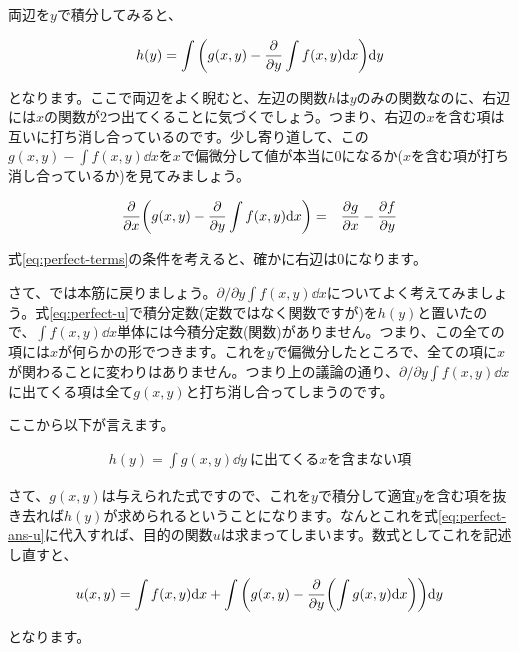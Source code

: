 両辺を$y$で積分してみると、

\begin{eqnarray}
    h(y)=\int\pqty{g(x,y)-\frac{\partial}{\partial y}\int f(x,y) \dd x}\dd y
\end{eqnarray}

\noindent
となります。ここで両辺をよく睨むと、左辺の関数$h$は$y$のみの関数なのに、右辺には$x$の関数が2つ出てくることに気づくでしょう。つまり、右辺の$x$を含む項は互いに打ち消し合っているのです。少し寄り道して、この$g(x,y)-\int f(x,y) \dd x$を$x$で偏微分して値が本当に0になるか($x$を含む項が打ち消し合っているか)を見てみましょう。

\begin{eqnarray}
    \frac{\partial}{\partial x}\pqty{g(x,y)-\frac{\partial}{\partial y}\int f(x,y) \dd x}&=&\frac{\partial g}{\partial x}-\frac{\partial f}{\partial y}
\end{eqnarray}

式\ref{eq:perfect-terms}の条件を考えると、確かに右辺は0になります。

さて、では本筋に戻りましょう。$\partial/\partial y\int f(x,y) \dd x$についてよく考えてみましょう。式\ref{eq:perfect-u}で積分定数(定数ではなく関数ですが)を$h(y)$と置いたので、$\int f(x,y) \dd x$単体には今積分定数(関数)がありません。つまり、この全ての項には$x$が何らかの形でつきます。これを$y$で偏微分したところで、全ての項に$x$が関わることに変わりはありません。つまり上の議論の通り、$\partial/\partial y\int f(x,y) \dd x$に出てくる項は全て$g(x,y)$と打ち消し合ってしまうのです。

ここから以下が言えます。

\begin{eqnarray}
    h(y)=\int g(x,y)\dd y\ \mbox{に出てくる$x$を含まない項}
\end{eqnarray}

さて、$g(x,y)$は与えられた式ですので、これを$y$で積分して適宜$y$を含む項を抜き去れば$h(y)$が求められるということになります。なんとこれを式\ref{eq:perfect-ans-u}に代入すれば、目的の関数$u$は求まってしまいます。数式としてこれを記述し直すと、

\begin{eqnarray}
    u(x,y)=\int f(x,y)\dd x+\int \pqty{g(x,y)-\frac{\partial}{\partial y}\pqty{\int g(x,y)\dd x}}\dd y
    \label{eq:perfect-ans}
\end{eqnarray}

\noindent
となります。







